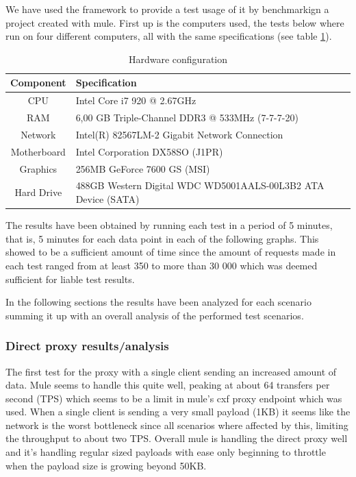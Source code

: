 
We have used the framework to provide a test usage of it by benchmarkign a project created with mule.
First up is the computers used, the tests below where run on four different computers, all with the same specifications (see table \ref{table:hw-spec}). 

\begin{table}[htpb]
	\caption{Hardware configuration}
	\label{table:hw-spec}
	\begin{tabular}{c l}
		Component & Specification \\ 
		\hline
		CPU & Intel Core i7 920 @ 2.67GHz  \\
		RAM &  6,00 GB Triple-Channel DDR3 @ 533MHz (7-7-7-20) \\
		Network &  Intel(R) 82567LM-2 Gigabit Network Connection \\
		Motherboard &  Intel Corporation DX58SO (J1PR) \\
		Graphics &  256MB GeForce 7600 GS (MSI) \\
		Hard Drive &  488GB Western Digital WDC WD5001AALS-00L3B2 ATA Device (SATA) \\
		\hline
	\end{tabular} 
\end{table}

The results have been obtained by running each test in a period of 5 minutes, that is, 5 minutes for each data point in each of the following graphs.
This showed to be a sufficient amount of time since the amount of requests made in each test ranged from at least 350 to more than 30 000 which was deemed sufficient for liable test results. 

In the following sections the results have been analyzed for each scenario summing it up with an overall analysis of the performed test scenarios.

\subsubsection{Direct proxy results/analysis}

The first test for the proxy with a single client sending an increased amount of data. Mule seems to handle this quite well, peaking at about 64 transfers per second (TPS) which seems to be a limit in mule's cxf proxy endpoint which was used. When a single client is sending a very small payload (1KB) it seems like the network is the worst bottleneck since all scenarios where affected by this, limiting the throughput to about two TPS. Overall mule is handling the direct proxy well and it's handling regular sized payloads with ease only beginning to throttle when the payload size is growing beyond 50KB.

